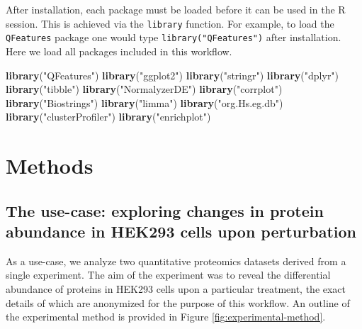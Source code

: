 \documentclass[9pt,a4paper,]{extarticle}
\newenvironment{Shaded}{\begin{snugshade}}{\end{snugshade}}
\newcommand{\FunctionTok}[1]{\textcolor[rgb]{0.13,0.29,0.53}{\textbf{#1}}}
\newcommand{\NormalTok}[1]{#1}
\newcommand{\StringTok}[1]{\textcolor[rgb]{0.31,0.60,0.02}{#1}}
\begin{document}
After installation, each package must be loaded before it can be used in the R
session. This is achieved via the \texttt{library} function. For example, to load the
\texttt{QFeatures} package one would type \texttt{library("QFeatures")} after installation.
Here we load all packages included in this workflow.

\begin{Shaded}
\begin{Highlighting}[]
\FunctionTok{library}\NormalTok{(}\StringTok{"QFeatures"}\NormalTok{)}
\FunctionTok{library}\NormalTok{(}\StringTok{"ggplot2"}\NormalTok{)}
\FunctionTok{library}\NormalTok{(}\StringTok{"stringr"}\NormalTok{)}
\FunctionTok{library}\NormalTok{(}\StringTok{"dplyr"}\NormalTok{)}
\FunctionTok{library}\NormalTok{(}\StringTok{"tibble"}\NormalTok{)}
\FunctionTok{library}\NormalTok{(}\StringTok{"NormalyzerDE"}\NormalTok{)}
\FunctionTok{library}\NormalTok{(}\StringTok{"corrplot"}\NormalTok{)}
\FunctionTok{library}\NormalTok{(}\StringTok{"Biostrings"}\NormalTok{)}
\FunctionTok{library}\NormalTok{(}\StringTok{"limma"}\NormalTok{)}
\FunctionTok{library}\NormalTok{(}\StringTok{"org.Hs.eg.db"}\NormalTok{)}
\FunctionTok{library}\NormalTok{(}\StringTok{"clusterProfiler"}\NormalTok{)}
\FunctionTok{library}\NormalTok{(}\StringTok{"enrichplot"}\NormalTok{)}
\end{Highlighting}
\end{Shaded}

\hypertarget{methods}{%
\section{Methods}\label{methods}}

\hypertarget{the-use-case-exploring-changes-in-protein-abundance-in-hek293-cells-upon-perturbation}{%
\subsection{The use-case: exploring changes in protein abundance in HEK293 cells upon perturbation}\label{the-use-case-exploring-changes-in-protein-abundance-in-hek293-cells-upon-perturbation}}

As a use-case, we analyze two quantitative proteomics datasets derived from a
single experiment. The aim of the experiment was to reveal the differential
abundance of proteins in HEK293 cells upon a particular treatment, the exact
details of which are anonymized for the purpose of this workflow. An outline of
the experimental method is provided in Figure \ref{fig:experimental-method}.
\end{document}
